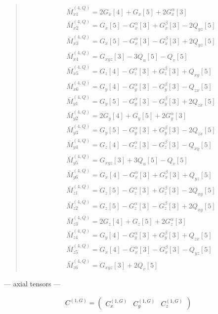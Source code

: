 \documentclass[fleqn,10pt]{jsarticle}
\begin{document}
\begin{quote}
\begin{align*}
& \bar{M}^{(4,Q)}_{x1} = 2 G_{x}[4] + G_{x}[5] + 2 G_{x}^{\alpha}[3] \\
& \bar{M}^{(4,Q)}_{x2} = G_{x}[5] - G_{x}^{\alpha}[3] + G_{x}^{\beta}[3] - 2 Q_{yz}[5] \\
& \bar{M}^{(4,Q)}_{x3} = G_{x}[5] - G_{x}^{\alpha}[3] - G_{x}^{\beta}[3] + 2 Q_{yz}[5] \\
& \bar{M}^{(4,Q)}_{x4} = G_{xyz}[3] - 3 Q_{u}[5] - Q_{v}[5] \\
& \bar{M}^{(4,Q)}_{x5} = G_{z}[4] - G_{z}^{\alpha}[3] + G_{z}^{\beta}[3] + Q_{xy}[5] \\
& \bar{M}^{(4,Q)}_{x6} = G_{y}[4] - G_{y}^{\alpha}[3] - G_{y}^{\beta}[3] - Q_{zx}[5] \\
& \bar{M}^{(4,Q)}_{y1} = G_{y}[5] - G_{y}^{\alpha}[3] - G_{y}^{\beta}[3] + 2 Q_{zx}[5] \\
& \bar{M}^{(4,Q)}_{y2} = 2 G_{y}[4] + G_{y}[5] + 2 G_{y}^{\alpha}[3] \\
& \bar{M}^{(4,Q)}_{y3} = G_{y}[5] - G_{y}^{\alpha}[3] + G_{y}^{\beta}[3] - 2 Q_{zx}[5] \\
& \bar{M}^{(4,Q)}_{y4} = G_{z}[4] - G_{z}^{\alpha}[3] - G_{z}^{\beta}[3] - Q_{xy}[5] \\
& \bar{M}^{(4,Q)}_{y5} = G_{xyz}[3] + 3 Q_{u}[5] - Q_{v}[5] \\
& \bar{M}^{(4,Q)}_{y6} = G_{x}[4] - G_{x}^{\alpha}[3] + G_{x}^{\beta}[3] + Q_{yz}[5] \\
& \bar{M}^{(4,Q)}_{z1} = G_{z}[5] - G_{z}^{\alpha}[3] + G_{z}^{\beta}[3] - 2 Q_{xy}[5] \\
& \bar{M}^{(4,Q)}_{z2} = G_{z}[5] - G_{z}^{\alpha}[3] - G_{z}^{\beta}[3] + 2 Q_{xy}[5] \\
& \bar{M}^{(4,Q)}_{z3} = 2 G_{z}[4] + G_{z}[5] + 2 G_{z}^{\alpha}[3] \\
& \bar{M}^{(4,Q)}_{z4} = G_{y}[4] - G_{y}^{\alpha}[3] + G_{y}^{\beta}[3] + Q_{zx}[5] \\
& \bar{M}^{(4,Q)}_{z5} = G_{x}[4] - G_{x}^{\alpha}[3] - G_{x}^{\beta}[3] - Q_{yz}[5] \\
& \bar{M}^{(4,Q)}_{z6} = G_{xyz}[3] + 2 Q_{v}[5]
\end{align*}
\end{quote}
\newpage
\begin{center}\LARGE --- axial tensors ---\end{center}
\begin{align*}
C^{(1,G)} = \begin{pmatrix} C^{(1,G)}_{x} & C^{(1,G)}_{y} & C^{(1,G)}_{z} \end{pmatrix}
\end{align*}
\end{document}
